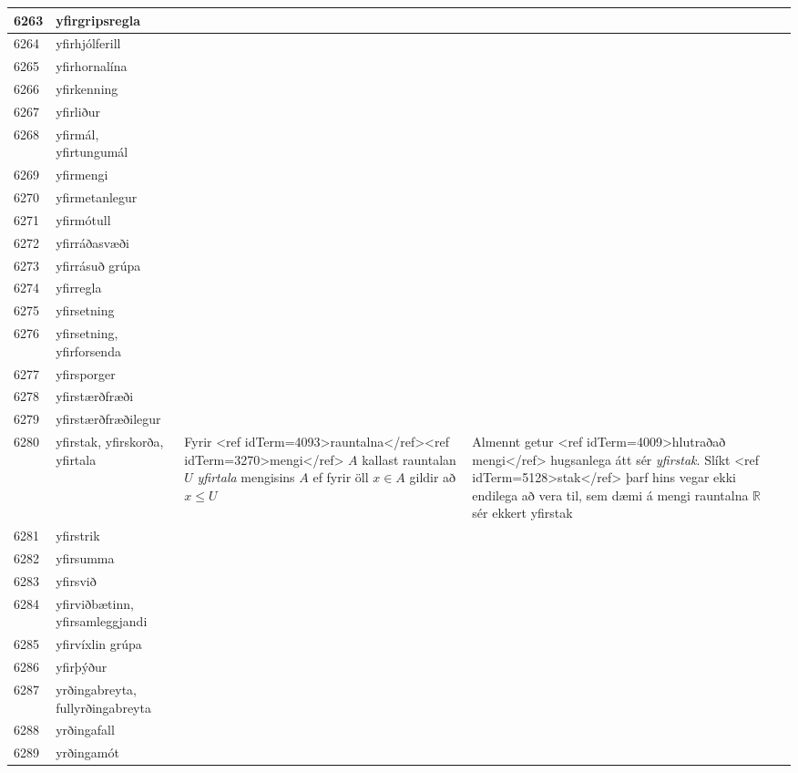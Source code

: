 \begin{longtable}{p{}|p{}|p{}|p{}|p{}}
\hline
6263 & yfirgripsregla &  &  &  \\
\hline
6264 & yfirhjólferill &  &  &  \\
\hline
6265 & yfirhornalína &  &  &  \\
\hline
6266 & yfirkenning &  &  &  \\
\hline
6267 & yfirliður &  &  &  \\
\hline
6268 & yfirmál, yfirtungumál &  &  &  \\
\hline
6269 & yfirmengi &  &  &  \\
\hline
6270 & yfirmetanlegur &  &  &  \\
\hline
6271 & yfirmótull &  &  &  \\
\hline
6272 & yfirráðasvæði &  &  &  \\
\hline
6273 & yfirrásuð grúpa &  &  &  \\
\hline
6274 & yfirregla &  &  &  \\
\hline
6275 & yfirsetning &  &  &  \\
\hline
6276 & yfirsetning, yfirforsenda &  &  &  \\
\hline
6277 & yfirsporger &  &  &  \\
\hline
6278 & yfirstærðfræði &  &  &  \\
\hline
6279 & yfirstærðfræðilegur &  &  &  \\
\hline
6280 & yfirstak, yfirskorða, yfirtala & Fyrir <ref idTerm=4093>rauntalna</ref><ref idTerm=3270>mengi</ref> $A$ kallast rauntalan $U$ \textit{yfirtala} mengisins $A$ ef fyrir öll $x \in A$ gildir að $x \leq U$ & Almennt getur <ref idTerm=4009>hlutraðað mengi</ref> hugsanlega átt sér \textit{yfirstak}. Slíkt <ref idTerm=5128>stak</ref> þarf hins vegar ekki endilega að vera til, sem dæmi á mengi rauntalna $\mathbb{R}$ sér ekkert yfirstak &  \\
\hline
6281 & yfirstrik &  &  &  \\
\hline
6282 & yfirsumma &  &  &  \\
\hline
6283 & yfirsvið &  &  &  \\
\hline
6284 & yfirviðbætinn, yfirsamleggjandi &  &  &  \\
\hline
6285 & yfirvíxlin grúpa &  &  &  \\
\hline
6286 & yfirþýður &  &  &  \\
\hline
6287 & yrðingabreyta, fullyrðingabreyta &  &  &  \\
\hline
6288 & yrðingafall &  &  &  \\
\hline
6289 & yrðingamót &  &  &  \\

\end{longtable}
